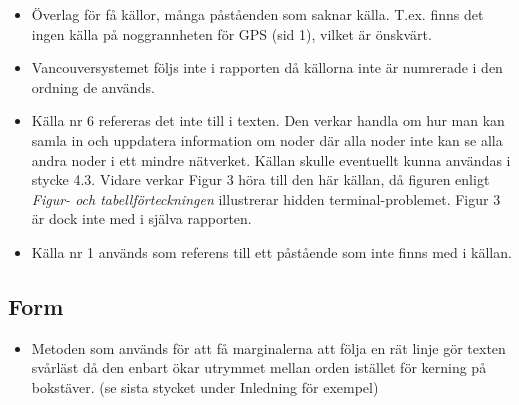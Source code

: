 \documentclass[a4paper,11pt]{article}
\begin{document}
\begin{itemize}
   \item Överlag för få källor, många påståenden som saknar källa. T.ex. finns det ingen källa på noggrannheten för GPS (sid 1), vilket är önskvärt.
   \item Vancouversystemet följs inte i rapporten då källorna inte är numrerade i den ordning de används.
   \item Källa nr 6 refereras det inte till i texten. Den verkar handla om hur man kan samla in och uppdatera information om noder där alla noder inte kan se alla andra noder i ett mindre nätverket. Källan skulle eventuellt kunna användas i stycke 4.3. Vidare verkar Figur 3 höra till den här källan, då figuren enligt \emph{Figur- och tabellförteckningen} illustrerar hidden terminal-problemet. Figur 3 är dock inte med i själva rapporten.
   \item Källa nr 1 används som referens till ett påstående som inte finns med i källan.
\end{itemize}

\subsection{Form}

\begin{itemize}
   \item Metoden som används för att få marginalerna att följa en rät linje gör texten svårläst då den enbart ökar utrymmet mellan orden istället för kerning på bokstäver. (se sista stycket under Inledning för exempel)
\end{itemize}
\end{document}
